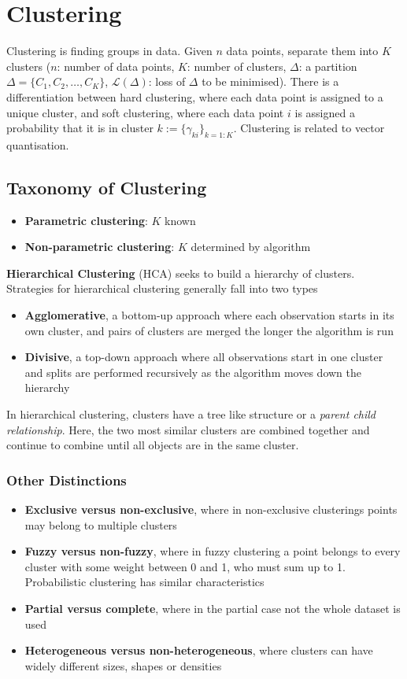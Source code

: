 \documentclass[11pt]{article}
\theoremstyle{definition}
\begin{document}
\section{Clustering}
Clustering is finding groups in data. Given $n$ data points, separate them into $K$ clusters ($n$: number of data points, $K$: number of clusters, $\Delta$: a partition $\Delta = \{C_1, C_2,\dots, C_K\}$, $\mathcal{L}(\Delta)$: loss of $\Delta$ to be minimised). There is a differentiation between hard clustering, where each data point is assigned to a unique cluster, and soft clustering, where each data point $i$ is assigned a probability that it is in cluster $k:=\{\gamma_{ki}\}_{k=1:K}$. Clustering is related to vector quantisation.

\subsection{Taxonomy of Clustering}
\begin{itemize}
	\item \textbf{Parametric clustering}: $K$ known
	\item \textbf{Non-parametric clustering}: $K$ determined by algorithm
\end{itemize}
\textbf{Hierarchical Clustering} (HCA) seeks to build a hierarchy of clusters. Strategies for hierarchical clustering generally fall into two types
\begin{itemize}
	\item \textbf{Agglomerative}, a bottom-up approach where each observation starts in its own cluster, and pairs of clusters are merged the longer the algorithm is run
	\item \textbf{Divisive}, a top-down approach where all observations start in one cluster and splits are performed recursively as the algorithm moves down the hierarchy
\end{itemize}
In hierarchical clustering, clusters have a tree like structure or a \emph{parent child relationship}. Here, the two most similar clusters are combined together and continue to combine until all objects are in the same cluster.

\subsubsection{Other Distinctions}
\begin{itemize}
	\item \textbf{Exclusive versus non-exclusive}, where in non-exclusive clusterings points may belong to multiple clusters
	\item \textbf{Fuzzy versus non-fuzzy}, where in fuzzy clustering a point belongs to every cluster with some weight between 0 and 1, who must sum up to 1. Probabilistic clustering has similar characteristics
	\item \textbf{Partial versus complete}, where in the partial case not the whole dataset is used
	\item \textbf{Heterogeneous versus non-heterogeneous}, where clusters can have widely different sizes, shapes or densities
\end{itemize}
\end{document}
